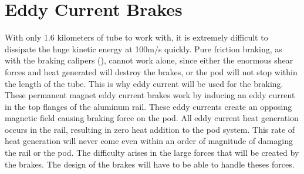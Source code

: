 \documentclass[main.tex]{subfiles}
\begin{document}
    \chapter{Eddy Current Brakes}
    \label{ch:eddy-current-brakes}
    With only 1.6 kilometers of tube to work with, it is extremely difficult to dissipate the huge kinetic energy at 100m/s quickly. Pure friction braking, as with the braking calipers (), cannot work alone, since either the enormous shear forces and heat generated will destroy the brakes, or the pod will not stop within the length of the tube. This is why eddy current will be used for the braking. These permanent magnet eddy current brakes work by inducing an eddy current in the top flanges of the aluminum rail. These eddy currents create an opposing magnetic field causing braking force on the pod. All eddy current heat generation occurs in the rail, resulting in zero heat addition to the pod system. This rate of heat generation will never come even within an order of magnitude of damaging the rail or the pod. The difficulty arises in the large forces that will be created by the brakes. The design of the brakes will have to be able to handle theses forces. 
\end{document}
